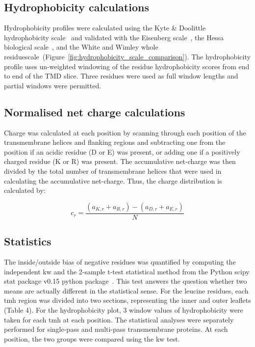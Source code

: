 \subsection{Hydrophobicity calculations}

Hydrophobicity profiles were calculated using the Kyte \& Doolittle hydrophobicity scale~\cite{Kyte1982} and validated with the Eisenberg scale~\cite{Eisenberg1984}, the Hessa biological scale~\cite{Hessa2005}, and the White and Wimley whole residuescale~\cite{White1999}(Figure~\ref{fig:hydrophobicity_scale_comparison}).
The hydrophobicity profile uses un-weighted windowing of the residue hydrophobicity scores from end to end of the TMD slice.
Three residues were used as full window lengths and partial windows were permitted.

\subsection{Normalised net charge calculations}

Charge was calculated at each position by scanning through each position of the transmembrane helices and flanking regions and subtracting one from the position if an acidic residue (D or E) was present, or adding one if a positively charged residue (K or R) was present.
The accumulative net-charge  was then divided by the total number  of transmembrane helices that were used in calculating the accumulative net-charge.
Thus, the charge distribution is calculated by:

\begin{equation} \label{eq:charge_equation}
c_r=\frac{(a_{K,r}+a_{R,r})-(a_{D,r}+a_{E,r})}{N}
\end{equation}

\subsection{Statistics}

The inside/outside bias of negative residues was quantified by computing the independent \gls{kw} and the 2-sample t-test statistical method from the Python scipy stat package v0.15 python package~\cite{VanderWalt2011}.
This test answers the question whether two means are actually different in the statistical sense.
For the leucine residues, each \gls{tmh} region was divided into two sections, representing the inner and outer leaflets (Table 4).
 For the hydrophobicity plot, 3 window values of hydrophobicity were taken for each \gls{tmh} at each position.
The statistical analyses were separately performed for single-pass and multi-pass transmembrane proteins.
At each position, the two groups were compared using the \gls{kw} test.

